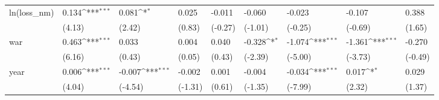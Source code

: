 \def\sym#1{\ifmmode^{#1}\else\(^{#1}\)\fi}
\begin{tabular}{p{1.5cm} p{2cm} p{1.7cm} p{1.7cm} p{1.7cm} p{1.7cm} p{1.7cm} p{1.7cm} p{1.7cm}}
\hline
ln(loss\_nm)     &    0.134\sym{***}&    0.081\sym{*}  &    0.025         &   -0.011         &   -0.060         &   -0.023         &   -0.107         &    0.388         \\
                &   (4.13)         &   (2.42)         &   (0.83)         &  (-0.27)         &  (-1.01)         &  (-0.25)         &  (-0.69)         &   (1.65)         \\
war             &    0.463\sym{***}&    0.033         &    0.004         &    0.040         &   -0.328\sym{*}  &   -1.074\sym{***}&   -1.361\sym{***}&   -0.270         \\
                &   (6.16)         &   (0.43)         &   (0.05)         &   (0.43)         &  (-2.39)         &  (-5.00)         &  (-3.73)         &  (-0.49)         \\
year            &    0.006\sym{***}&   -0.007\sym{***}&   -0.002         &    0.001         &   -0.004         &   -0.034\sym{***}&    0.017\sym{*}  &    0.029         \\
                &   (4.04)         &  (-4.54)         &  (-1.31)         &   (0.61)         &  (-1.35)         &  (-7.99)         &   (2.32)         &   (1.37)         \\
\end{tabular}
